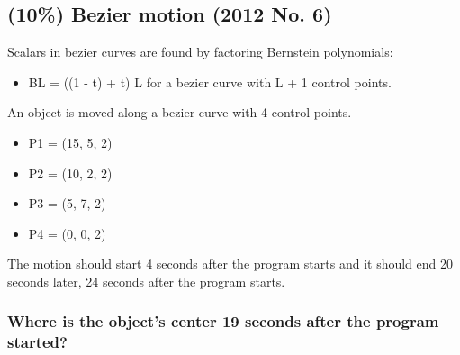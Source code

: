 \subsection{(10\%) Bezier motion (2012 No. 6)}
Scalars in bezier curves are found by factoring Bernstein polynomials:
\begin{itemize}
    \item BL = ((1 - t) + t) L for a bezier curve with L + 1 control points.
\end{itemize}

An object is moved along a bezier curve with 4 control points.
\begin{itemize}
    \item P1 = (15, 5, 2)
    \item P2 = (10, 2, 2)
    \item P3 = (5, 7, 2)
    \item P4 = (0, 0, 2)
\end{itemize}

The motion should start 4 seconds after the program starts and it should end 20 seconds later, 24 seconds after the program starts.

\subsubsection{Where is the object's center 19 seconds after the program started?}

